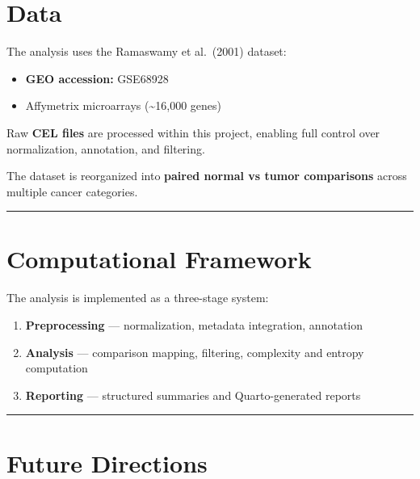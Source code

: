\documentclass[
  letterpaper,
  DIV=11,
  numbers=noendperiod,
  openany,
  oneside]{scrreprt}
\providecommand{\tightlist}{%
  \setlength{\itemsep}{0pt}\setlength{\parskip}{0pt}}
\begin{document}
\section{Data}\label{data}

The analysis uses the Ramaswamy et al.~(2001) dataset:

\begin{itemize}
\tightlist
\item
  \textbf{GEO accession:} GSE68928\\
\item
  Affymetrix microarrays (\textasciitilde16,000 genes)
\end{itemize}

Raw \textbf{CEL files} are processed within this project, enabling full
control over normalization, annotation, and filtering.

The dataset is reorganized into \textbf{paired normal vs tumor
comparisons} across multiple cancer categories.

\begin{center}\rule{0.5\linewidth}{0.5pt}\end{center}

\section{Computational Framework}\label{computational-framework}

The analysis is implemented as a three-stage system:

\begin{enumerate}
\def\labelenumi{\arabic{enumi}.}
\tightlist
\item
  \textbf{Preprocessing} --- normalization, metadata integration,
  annotation\\
\item
  \textbf{Analysis} --- comparison mapping, filtering, complexity and
  entropy computation\\
\item
  \textbf{Reporting} --- structured summaries and Quarto-generated
  reports
\end{enumerate}

\begin{center}\rule{0.5\linewidth}{0.5pt}\end{center}

\section{Future Directions}\label{future-directions}
\end{document}
